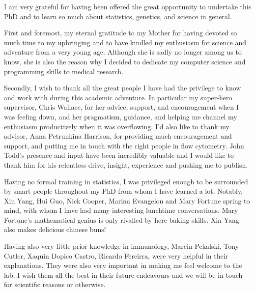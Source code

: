 
\begin{acknowledgements}      

 I am very grateful for having been offered the great opportunity to undertake this PhD and to learn so much about statistics,
 genetics, and science in general.

 First and foremost, my eternal gratitude to my Mother for having devoted so much time to my upbringing and to have kindled my enthusiasm for science
 and adventure from a very young age.
 Although she is sadly no longer among us to know,
 she is also the reason why I decided to dedicate my computer science and programming skills to medical research.

 Secondly, I wish to thank all the great people I have had the privilege to know and work with during this academic adventure.
 In particular my super-hero supervisor, Chris Wallace, for her advice, support, and encouragement when I was feeling down, and her pragmatism, guidance,
 and helping me channel my enthusiasm productively when it was overflowing.
 I'd also like to thank my advisor, Anna Petrunkina Harrison, for providing much encouragement and support,
 and putting me in touch with the right people in flow cytometry.
 John Todd's presence and input have been incredibly valuable and I would like to thank him for his relentless drive, insight, experience
 and pushing me to publish.

 Having no formal training in statistics,
 I was privileged enough to be surrounded by smart people throughout my PhD from whom I have learned a lot.
 Notably, Xin Yang, Hui Guo, Nick Cooper, Marina Evangelou and Mary Fortune spring to mind, with whom I have had many interesting lunchtime conversations.
 Mary Fortune's  mathematical genius is only rivalled by here baking skills.
 Xin Yang also makes delicious chinese buns!

 Having also very little prior knowledge in immunology, Marcin Pekalski, Tony Cutler, Xaquin Dopico Castro, Ricardo Fereirra, were very helpful in their explanations.
 They were also very important in making me feel welcome to the lab.
 I wish them all the best in their future endeavours and we will be in touch for scientific reasons or otherwise.


\end{acknowledgements}
